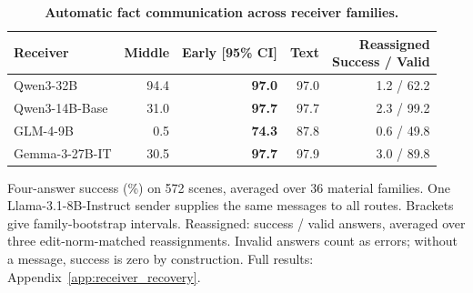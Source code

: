 \begin{table}[H]
\caption{\textbf{Automatic fact communication across receiver families.}}
\label{tab:recovery_main}
\centering\normalsize
\setlength{\tabcolsep}{3pt}\renewcommand{\arraystretch}{1.16}
\begin{tabular*}{\linewidth}{@{\extracolsep{\fill}}lrrrr@{}}
\toprule
Receiver & Middle & \textbf{Early [95\% CI]} & Text & \shortstack[r]{Reassigned\\Success / Valid} \\
\midrule
Qwen3-32B & 94.4 & \textbf{97.0}\enspace {\footnotesize [93.2, 99.5]} & 97.0 & 1.2 / 62.2 \\
Qwen3-14B-Base & 31.0 & \textbf{97.7}\enspace {\footnotesize [95.1, 99.8]} & 97.7 & 2.3 / 99.2 \\
GLM-4-9B & 0.5 & \textbf{74.3}\enspace {\footnotesize [66.9, 81.3]} & 87.8 & 0.6 / 49.8 \\
Gemma-3-27B-IT & 30.5 & \textbf{97.7}\enspace {\footnotesize [94.8, 100.0]} & 97.9 & 3.0 / 89.8 \\
\bottomrule
\end{tabular*}
\par\vspace{3pt}
{\footnotesize\raggedright Four-answer success (\%) on 572 scenes, averaged over 36 material families. One Llama-3.1-8B-Instruct sender supplies the same messages to all routes. Brackets give family-bootstrap intervals. Reassigned: success / valid answers, averaged over three edit-norm-matched reassignments. Invalid answers count as errors; without a message, success is zero by construction. Full results: Appendix~\ref{app:receiver_recovery}.\par}
\end{table}
